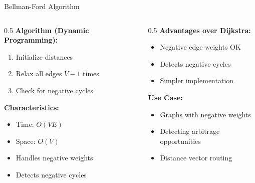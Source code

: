 \documentclass[aspectratio=169,xcolor=dvipsnames]{beamer}
\begin{document}
\begin{frame}{Bellman-Ford Algorithm}
  \begin{columns}
    \begin{column}{0.5\textwidth}
      \textbf{Algorithm (Dynamic Programming):}
      \begin{enumerate}
        \item Initialize distances
        \item Relax all edges $V-1$ times
        \item Check for negative cycles
      \end{enumerate}

      \vspace{0.3cm}
      \textbf{Characteristics:}
      \begin{itemize}
        \item Time: $O(VE)$
        \item Space: $O(V)$
        \item Handles negative weights
        \item Detects negative cycles
      \end{itemize}
    \end{column}

    \begin{column}{0.5\textwidth}
      \textbf{Advantages over Dijkstra:}
      \begin{itemize}
        \item Negative edge weights OK
        \item Detects negative cycles
        \item Simpler implementation
      \end{itemize}

      \vspace{0.3cm}
      \textbf{Use Case:}
      \begin{itemize}
        \item Graphs with negative weights
        \item Detecting arbitrage opportunities
        \item Distance vector routing
      \end{itemize}
    \end{column}
  \end{columns}
\end{frame}
\end{document}
